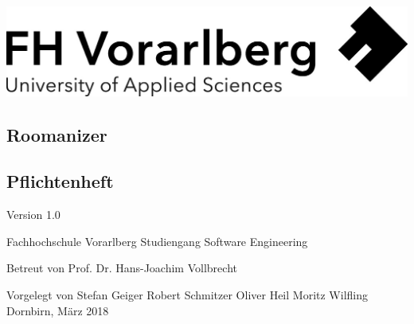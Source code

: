 \documentclass[a4paper,12pt,twoside]{scrreprt}
\begin{document}
    \cleardoublepage   %
    \thispagestyle{empty}
    \begin{titlepage}
        \begin{flushright}
            \includegraphics[width=0.4\linewidth]{./assets/Logo-A3}
        \end{flushright}
        \begin{flushleft}
            \section*{Roomanizer}
            \subsection*{Pflichtenheft}
            \vspace{1cm}

            Version 1.0\\
            \vspace{0.5cm}


            \vspace{2cm}
            Fachhochschule Vorarlberg\newline
            Studiengang Software Engineering

            \vspace{0.5cm}

            Betreut von\newline
            Prof. Dr. Hans-Joachim Vollbrecht

            \vspace{0.5cm}

            Vorgelegt von\newline
            Stefan Geiger\newline
            Robert Schmitzer\newline
            Oliver Heil\newline
            Moritz Wilfling\newline
            Dornbirn, März 2018
        \end{flushleft}
    \end{titlepage}

    \cleardoublepage   %
    \tableofcontents
\end{document}

